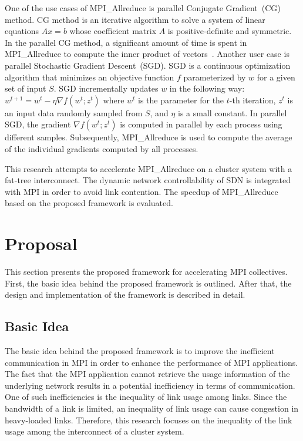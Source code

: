 One of the use cases of MPI\_Allreduce is parallel Conjugate Gradient~(CG)
method. CG method is an iterative algorithm to solve a system of linear
equations $Ax = b$ whose coefficient matrix $A$ is positive-definite and
symmetric. In the parallel CG method, a significant amount of time is spent in
MPI\_Allreduce to compute the inner product of
vectors~\autocite{Kandalla2012}. Another user case is parallel Stochastic
Gradient Descent~(SGD). SGD is a continuous optimization algorithm that
minimizes an objective function $f$ parameterized by $w$ for a given set of
input $S$. SGD incrementally updates $w$ in the following way: $w^{t+1}=w^t-
\eta \nabla f(w^t; z^t)$ where $w^t$ is the parameter for the $t$-th
iteration, $z^t$ is an input data randomly sampled from $S$, and $\eta$ is a
small constant. In parallel SGD, the gradient $\nabla f(w^t; z^t)$ is computed
in parallel by each process using different samples. Subsequently,
MPI\_Allreduce is used to compute the average of the individual gradients
computed by all processes.

This research attempts to accelerate MPI\_Allreduce on a cluster system with a
fat-tree interconnect. The dynamic network controllability of SDN is
integrated with MPI in order to avoid link contention. The speedup of
MPI\_Allreduce based on the proposed framework is evaluated.

\section{Proposal}\label{sec:iii-proposal}

This section presents the proposed framework for accelerating MPI collectives.
First, the basic idea behind the proposed framework is outlined. After that,
the design and implementation of the framework is described in detail.

\subsection{Basic Idea}

The basic idea behind the proposed framework is to improve the inefficient
communication in MPI in order to enhance the performance of MPI applications.
The fact that the MPI application cannot retrieve the usage information of the
underlying network results in a potential inefficiency in terms of
communication. One of such inefficiencies is the inequality of link usage
among links. Since the bandwidth of a link is limited, an inequality of link
usage can cause congestion in heavy-loaded links. Therefore, this research
focuses on the inequality of the link usage among the interconnect of a
cluster system.

